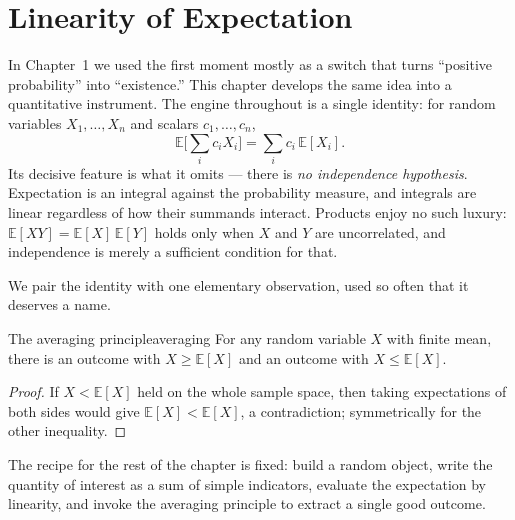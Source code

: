 \providecommand{\E}{\mathbb{E}}
\providecommand{\Prob}{\mathbb{P}}
\providecommand{\ind}{\mathbf{1}}
\providecommand{\cross}{\operatorname{cr}}

\chapter{Linearity of Expectation}
\label{chap:linearity}

In Chapter~1 we used the first moment mostly as a switch that turns ``positive
probability'' into ``existence.'' This chapter develops the same idea into a
quantitative instrument. The engine throughout is a single identity: for
random variables $X_1,\dots,X_n$ and scalars $c_1,\dots,c_n$,
\[
  \E\!\Big[\textstyle\sum_i c_i X_i\Big] = \sum_i c_i\,\E[X_i].
\]
Its decisive feature is what it omits --- there is \emph{no independence
hypothesis}. Expectation is an integral against the probability measure, and
integrals are linear regardless of how their summands interact. Products
enjoy no such luxury: $\E[XY]=\E[X]\,\E[Y]$ holds only when $X$ and $Y$ are
uncorrelated, and independence is merely a sufficient condition for that.

We pair the identity with one elementary observation, used so often that it
deserves a name.

\begin{proposition}{The averaging principle}{averaging}
For any random variable $X$ with finite mean, there is an outcome with
$X\ge\E[X]$ and an outcome with $X\le\E[X]$.
\end{proposition}

\begin{proof}
If $X<\E[X]$ held on the whole sample space, then taking expectations of both
sides would give $\E[X]<\E[X]$, a contradiction; symmetrically for the other
inequality.
\end{proof}

The recipe for the rest of the chapter is fixed: build a random object, write
the quantity of interest as a sum of simple indicators, evaluate the
expectation by linearity, and invoke the averaging principle to extract a
single good outcome.

